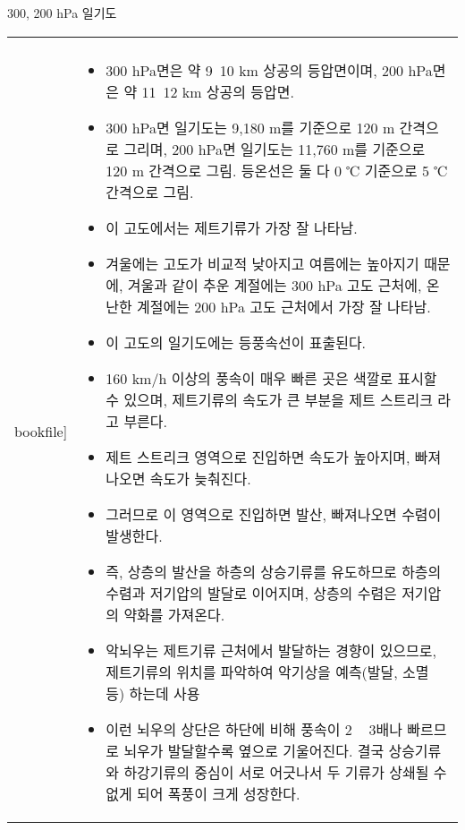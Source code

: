 \begin{frame}[t]{300, 200 hPa 일기도}
	\begin{tabular}{ll}
		\begin{minipage}[t]{0.3\textwidth}\scriptsize
			\begin{figure}[t]
				\texttt{[image: \\bookfile]}
			\end{figure}
		\end{minipage}	
		&
		\begin{minipage}[t]{0.65\textwidth} \scriptsize	
			\begin{itemize}
				\item 300 hPa면은 약 9~10 km 상공의 등압면이며, 200 hPa면은 약 11~12 km 상공의 등압면.
				\item 300 hPa면 일기도는 9,180 m를 기준으로 120 m 간격으로 그리며, 200 hPa면 일기도는 11,760 m를 기준으로 120 m 간격으로 그림.
				등온선은 둘 다 0 ℃ 기준으로  5 ℃ 간격으로 그림. 
				\item 이 고도에서는 제트기류가 가장 잘 나타남. 
				\item 겨울에는 고도가 비교적 낮아지고 여름에는 높아지기 때문에, 겨울과 같이 추운 계절에는 300 hPa 고도 근처에, 온난한 계절에는 200 hPa 고도 근처에서 가장 잘 나타남. 
			    \item 이 고도의 일기도에는 등풍속선이 표출된다. 
				\item 160 km/h 이상의 풍속이 매우 빠른 곳은 색깔로 표시할 수 있으며, 제트기류의 속도가 큰 부분을 제트 스트리크 라고 부른다. 
				\item 제트 스트리크 영역으로 진입하면 속도가 높아지며, 빠져나오면 속도가 늦춰진다. 
				\item 그러므로 이 영역으로 진입하면 발산, 빠져나오면 수렴이 발생한다.
				\item 즉, 상층의 발산을 하층의 상승기류를 유도하므로 하층의 수렴과 저기압의 발달로 이어지며, 상층의 수렴은 저기압의 약화를 가져온다. 
			    \item 악뇌우는 제트기류 근처에서 발달하는 경향이 있으므로, 제트기류의 위치를 파악하여 악기상을 예측(발달, 소멸 등) 하는데 사용
       			\item 이런 뇌우의 상단은 하단에 비해 풍속이 2 ~ 3배나 빠르므로 뇌우가 발달할수록 옆으로 기울어진다. 결국 상승기류와 하강기류의 중심이 서로 어긋나서 두 기류가 상쇄될 수 없게 되어 폭풍이 크게 성장한다. 
	
			\end{itemize}

		\end{minipage}
	\end{tabular}
\end{frame}



